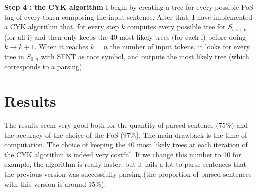 \documentclass{article}
\begin{document}
\textbf{Step 4 : the CYK algorithm}
I begin by creating a tree for every possible PoS tag of every token composing the input sentence. After that, I have implemented a CYK algorithm that, for every step $k$ computes every possible tree for $S_{i,i+k}$ (for all i) and then only keeps the 40 most likely trees (for each i) before doing $k \rightarrow k+1$. When it reaches $k=n$ the number of input tokens, it looks for every tree in $S_{0,n}$ with SENT as root symbol, and outputs the most likely tree (which corresponds to a parsing).

\section{Results}
The results seem very good both for the quantity of parsed sentence ($75\%$) and the accuracy of the choice of the PoS ($97\%$). The main drawback is the time of computation. The choice of keeping the 40 most likely trees at each iteration of the CYK algorithm is indeed very costful. If we change this number to 10 for example, the algorithm is really faster, but it fails a lot to parse sentences that the previous version was successfully parsing (the proportion of parsed sentences with this version is around $15\%$).
\end{document}

